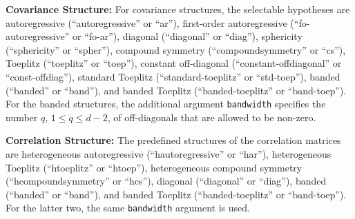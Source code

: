 \begin{itemize}
  \textbf{Covariance Structure:} For covariance structures, the
  selectable hypotheses are autoregressive (``autoregressive'' or
  ``ar''), first-order autoregressive (``fo-autoregressive'' or
  ``fo-ar''), diagonal (``diagonal'' or ``diag''), sphericity
  (``sphericity'' or ``spher''), compound symmetry (``compoundsymmetry''
  or ``cs''), Toeplitz (``toeplitz'' or ``toep''), constant off-diagonal
  (``constant-offdiagonal'' or ``const-offdiag''), standard Toeplitz
  (``standard-toeplitz'' or ``std-toep''), banded (``banded'' or
  ``band''), and banded Toeplitz (``banded-toeplitz'' or
  ``band-toep''). For the banded structures, the additional argument
  \texttt{bandwidth} specifies the number \(q\), \(1 \leq q \leq d-2\), of
  off-diagonals that are allowed to be non-zero.

  \textbf{Correlation Structure:} The predefined structures of
  the correlation matrices are heterogeneous autoregressive
  (``hautoregressive'' or ``har''), heterogeneous Toeplitz
  (``htoeplitz'' or ``htoep''), heterogeneous compound symmetry
  (``hcompoundsymmetry'' or ``hcs''), diagonal (``diagonal'' or
  ``diag''), banded (``banded'' or ``band''), and banded Toeplitz
  (``banded-toeplitz'' or ``band-toep''). For the latter two, the same
  \texttt{bandwidth} argument is used.


\end{itemize}
